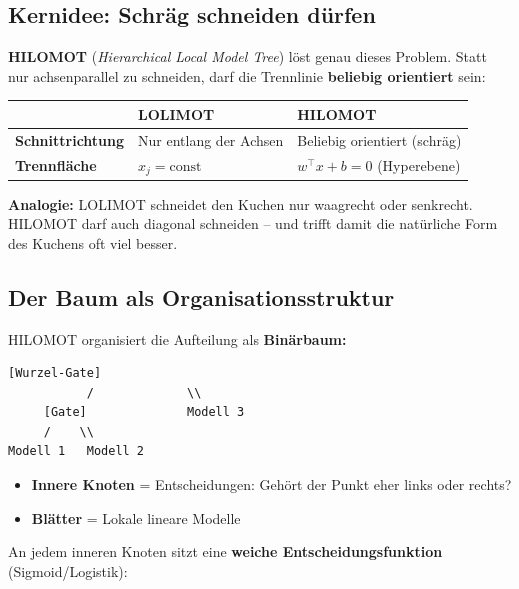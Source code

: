 \documentclass[12pt,a4paper]{article}
\begin{document}
\subsection{Kernidee: Schräg schneiden dürfen}

\textbf{HILOMOT} (\textit{Hierarchical Local Model Tree}) löst genau dieses Problem. Statt nur achsenparallel zu schneiden, darf die Trennlinie \textbf{beliebig orientiert} sein:

\begin{center}
\begin{tabular}{lll}
\toprule
 & \textbf{LOLIMOT} & \textbf{HILOMOT} \\
\midrule
\textbf{Schnittrichtung} & Nur entlang der Achsen & Beliebig orientiert (schräg) \\
\textbf{Trennfläche} & $x_j = \text{const}$ & $w^\top x + b = 0$ (Hyperebene) \\
\bottomrule
\end{tabular}
\end{center}

\begin{mdframed}
\textbf{Analogie:} LOLIMOT schneidet den Kuchen nur waagrecht oder senkrecht. HILOMOT darf auch diagonal schneiden -- und trifft damit die natürliche Form des Kuchens oft viel besser.
\end{mdframed}

\subsection{Der Baum als Organisationsstruktur}

HILOMOT organisiert die Aufteilung als \textbf{Binärbaum:}

\begin{Verbatim}[frame=single]
            [Wurzel-Gate]
           /             \\
     [Gate]              Modell 3
     /    \\
Modell 1   Modell 2
\end{Verbatim}

\begin{itemize}
  \item \textbf{Innere Knoten} = Entscheidungen: \glqq Gehört der Punkt eher links oder rechts?\grqq
  \item \textbf{Blätter} = Lokale lineare Modelle
\end{itemize}

An jedem inneren Knoten sitzt eine \textbf{weiche Entscheidungsfunktion} (Sigmoid/Logistik):
\end{document}
